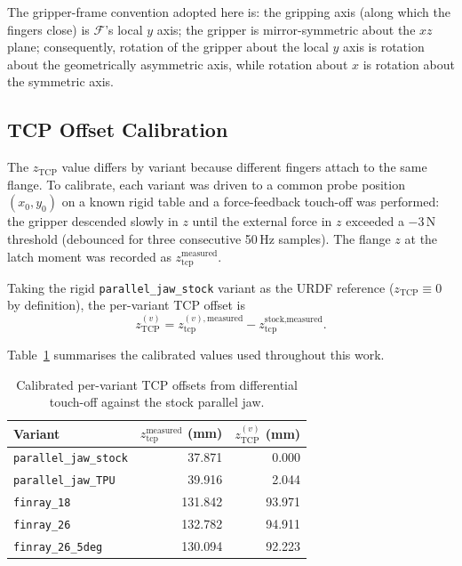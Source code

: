 The gripper-frame convention adopted here is: the gripping axis (along which
the fingers close) is $\mathcal{F}$'s local $y$ axis; the gripper is
mirror-symmetric about the $xz$ plane; consequently, rotation of the gripper
about the local $y$ axis is rotation about the geometrically asymmetric
axis, while rotation about $x$ is rotation about the symmetric axis.

\subsection{TCP Offset Calibration}
\label{sec:tcp-calib}

The $z_{\text{TCP}}$ value differs by variant because different fingers
attach to the same flange. To calibrate, each variant was driven to a
common probe position $(x_0, y_0)$ on a known rigid table and a force-feedback
touch-off was performed: the gripper descended slowly in $z$ until the
external force in $z$ exceeded a $-3$\,N threshold (debounced for three
consecutive 50\,Hz samples). The flange $z$ at the latch moment was
recorded as $z_{\text{tcp}}^{\text{measured}}$.

Taking the rigid \texttt{parallel\_jaw\_stock} variant as the URDF reference
($z_{\text{TCP}} \equiv 0$ by definition), the per-variant TCP offset is
\begin{equation}
  z_{\text{TCP}}^{(v)} = z_{\text{tcp}}^{(v),\text{measured}}
                       - z_{\text{tcp}}^{\text{stock},\text{measured}}.
  \label{eq:tcp-calib}
\end{equation}

Table~\ref{tab:tcp-calib} summarises the calibrated values used throughout
this work.

\begin{table}[ht]
\centering
\caption[Calibrated TCP offsets]{Calibrated per-variant TCP offsets from
differential touch-off against the stock parallel jaw.}
\label{tab:tcp-calib}
\begin{tabular}{lrr}
\toprule
Variant & $z_{\text{tcp}}^{\text{measured}}$ (mm) & $z_{\text{TCP}}^{(v)}$ (mm) \\
\midrule
\texttt{parallel\_jaw\_stock}    & 37.871 & 0.000 \\
\texttt{parallel\_jaw\_TPU}      & 39.916 & 2.044 \\
\texttt{finray\_18}              & 131.842 & 93.971 \\
\texttt{finray\_26}              & 132.782 & 94.911 \\
\texttt{finray\_26\_5deg}        & 130.094 & 92.223 \\
\bottomrule
\end{tabular}
\end{table}

